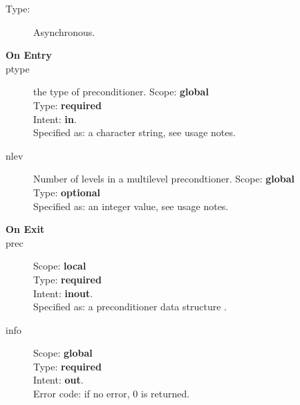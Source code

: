 





\begin{description}
\item[Type:] Asynchronous.
\item[\bf On Entry]
\item[ptype] the type of preconditioner. 
Scope: {\bf global} \\
Type: {\bf required}\\
Intent: {\bf in}.\\
Specified as: a character string, see usage notes.
\item[nlev] Number of levels in a multilevel  precondtioner. 
Scope: {\bf global} \\
Type: {\bf optional}\\
Specified as: an integer value, see usage notes. 
\item[\bf On Exit]

\item[prec] 
Scope: {\bf local} \\
Type: {\bf required}\\
Intent: {\bf inout}.\\
Specified as: a preconditioner data structure \precdata.
\item[info] 
Scope: {\bf global} \\
Type: {\bf required}\\
Intent: {\bf out}.\\
Error code: if no error, 0 is returned.
\end{description}
